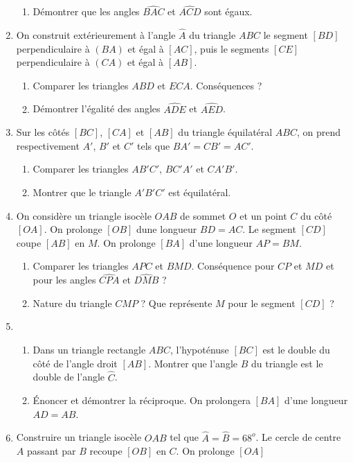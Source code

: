 \documentclass[12 pt]{report}
\theoremstyle{plain}
\newcounter{n}
\begin{document}
\begin{enumerate}
\begin{enumerate}
\item Démontrer que les angles $\widehat{BAC}$ et $\widehat{ACD}$ sont égaux.
\end{enumerate}
\item On construit extérieurement à l'angle $\widehat{A}$ du triangle $ABC$ le 
segment $[BD]$ perpendiculaire à $(BA)$ et égal à $[AC]$, puis le segments $[CE]$
perpendiculaire à $(CA)$ et égal à $[AB]$. 
\begin{enumerate}
\item Comparer les triangles $ABD$ et $ECA$. Conséquences ? 
\item Démontrer l'égalité des angles $\widehat{ADE}$ et $\widehat{AED}$.
\end{enumerate}
\item Sur les côtés $[BC]$, $[CA]$ et $[AB]$ du triangle équilatéral $ABC$, 
on prend respectivement $A'$, $B'$ et $C'$ tels que $BA'=CB'=AC'$.\begin{enumerate}
\item Comparer les triangles $AB'C'$, $BC'A'$ et $CA'B'$. 
\item Montrer que le triangle $A'B'C'$ est équilatéral.
\end{enumerate}
\item On considère un triangle isocèle $OAB$ de sommet $O$ et un point $C$ du côté $[OA]$. On prolonge $[OB]$ dune longueur $BD=AC$. Le segment $[CD]$ coupe $[AB]$ en
$M$. On prolonge $[BA]$ d'une longueur $AP=BM$. \begin{enumerate}
\item Comparer les triangles $APC$ et $BMD$. Conséquence pour $CP$ et $MD$ et pour
les angles $\widehat{CPA}$ et $\widehat{DMB}$ ? 
\item Nature du triangle $CMP$ ? Que représente $M$ pour le segment $[CD]$ ?
\end{enumerate}
\item \begin{enumerate} \item Dans un triangle rectangle $ABC$, l'hypoténuse $[BC]$ est le double du côté de l'angle droit $[AB]$. Montrer que l'angle $\widehat{B}$ du triangle est le double 
de l'angle $\widehat{C}$.
\item Énoncer et démontrer la réciproque. On prolongera $[BA]$ d'une longueur $AD=AB$.\end{enumerate}
\item Construire un triangle isocèle $OAB$ tel que $\widehat{A} = \widehat{B}= 68^o$. 
Le cercle de centre $A$ passant par $B$ recoupe $[OB]$ en $C$. On prolonge $[OA]$ 

\end{enumerate}
\end{document}
